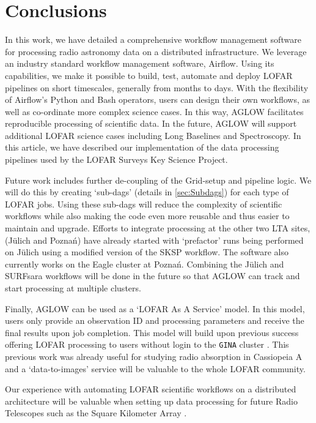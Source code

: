\section{Conclusions}\label{sec:conclusions}

In this work, we have detailed a comprehensive workflow management software for processing radio astronomy data on a distributed infrastructure. We leverage an industry standard workflow management software, Airflow. Using its capabilities, we make it possible to build, test, automate and deploy LOFAR pipelines on short timescales, generally from months to days. With the flexibility of Airflow's Python and Bash operators, users can design their own workflows, as well as co-ordinate more complex science cases. In this way, AGLOW facilitates reproducible processing of scientific data. In the future, AGLOW will support additional LOFAR science cases including Long Baselines and Spectroscopy. In this article, we have described our implementation of the data processing pipelines used by the LOFAR Surveys Key Science Project. 

Future work includes further de-coupling of the Grid-setup and pipeline logic. We will do this by creating `sub-dags' (details in \ref{sec:Subdags}) for each type of LOFAR jobs. Using these sub-dags will reduce the complexity of scientific workflows while also making the code even more reusable and thus easier to maintain and upgrade. Efforts to integrate processing at the other two LTA sites, (J\"{u}lich and Pozna\'{n}) have already started with `prefactor' runs being performed on J\"{u}lich using a modified version of the SKSP workflow. The software also currently works on the Eagle cluster at Pozna\'{n}. Combining the J\"{u}lich and SURFsara workflows will be done in the future so that AGLOW can track and start processing at multiple clusters. 

Finally, AGLOW can be used as a `LOFAR As A Service' model.  In this model, users only provide an observation ID and processing parameters and receive the final results upon job completion. This model will build upon previous success offering LOFAR processing to users without login to the \texttt{GINA} cluster \cite{oonk_prep}. This previous work was already useful for studying radio absorption in Cassiopeia A \cite{maria} and a `data-to-images' service will be valuable to the whole LOFAR community.

Our experience with automating LOFAR scientific workflows on a distributed architecture will be valuable when setting up data processing for future Radio Telescopes such as the Square Kilometer Array \cite{ska} . 



